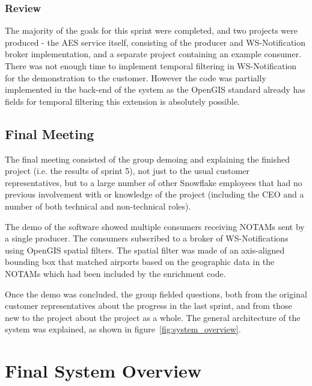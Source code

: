 \documentclass[a4paper, 12pt, twoside]{article}
\begin{document}
\subsubsection{Review}

The majority of the goals for this sprint were completed, and two projects were produced - the AES service itself, consisting of the producer and WS-Notification broker implementation, and a separate project containing an example consumer. There was not enough time to implement temporal filtering in WS-Notification for the demonstration to the customer. However the code was partially implemented in the back-end of the system as the OpenGIS standard already has fields for temporal filtering this extension is absolutely possible.

\subsection{Final Meeting}
\label{sec:impl_final_meeting}

The final meeting consisted of the group demoing and explaining the finished project (i.e. the results of sprint 5), not just to the usual customer representatives, but to a large number of other Snowflake employees that had no previous involvement with or knowledge of the project (including the CEO and a number of both technical and non-technical roles).

The demo of the software showed multiple consumers receiving NOTAMs sent by a single producer. The consumers subscribed to a broker of WS-Notifications using OpenGIS spatial filters. The spatial filter was made of an axis-aligned bounding box that matched airports based on the geographic data in the NOTAMs which had been included by the enrichment code.

Once the demo was concluded, the group fielded questions, both from the original customer representatives about the progress in the last sprint, and from those new to the project about the project as a whole. The general architecture of the system was explained, as shown in figure~\ref{fig:system_overview}.

\section{Final System Overview}
\label{sec:final_system}
\end{document}
